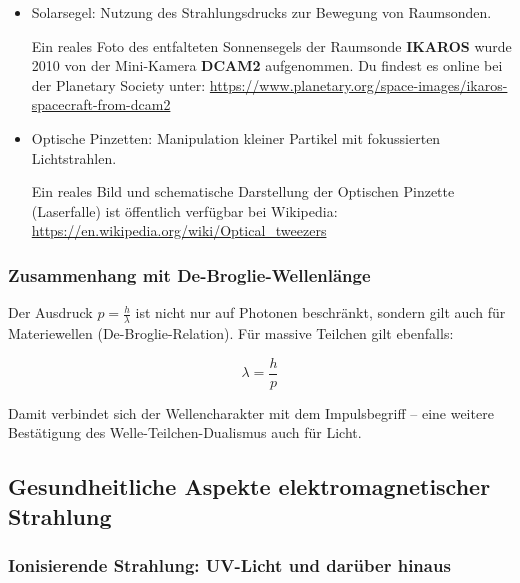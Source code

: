 \begin{itemize}
	\item Solarsegel: Nutzung des Strahlungsdrucks zur Bewegung von Raumsonden.
	\begin{tcolorbox}[hinweisbox, title=Reales Bildmaterial]
		\label{keybox:RealesBildmaterial}
		Ein reales Foto des entfalteten Sonnensegels der Raumsonde \textbf{IKAROS} wurde 2010 von der Mini-Kamera \textbf{DCAM2} aufgenommen.  
		Du findest es online bei der Planetary Society unter:  
		\url{https://www.planetary.org/space-images/ikaros-spacecraft-from-dcam2}
	\end{tcolorbox}
	\item Optische Pinzetten: Manipulation kleiner Partikel mit fokussierten Lichtstrahlen.
	\begin{tcolorbox}[hinweisbox, title=Reales Bildmaterial zur optischen Pinzette]
		\label{box:Manipulation kleiner Partikel}
		Ein reales Bild und schematische Darstellung der Optischen Pinzette (Laserfalle) ist öffentlich verfügbar bei Wikipedia:  
		\url{https://en.wikipedia.org/wiki/Optical_tweezers}
	\end{tcolorbox}
\end{itemize}

\subsubsection{Zusammenhang mit De-Broglie-Wellenlänge}

Der Ausdruck \( p = \frac{h}{\lambda} \) ist nicht nur auf Photonen beschränkt, sondern gilt auch für Materiewellen (De-Broglie-Relation). Für massive Teilchen gilt ebenfalls:

\[
\lambda = \frac{h}{p}
\]

Damit verbindet sich der Wellencharakter mit dem Impulsbegriff – eine weitere Bestätigung des Welle-Teilchen-Dualismus auch für Licht.

\subsection{Gesundheitliche Aspekte elektromagnetischer  Strahlung}

\subsubsection{Ionisierende Strahlung: UV-Licht und darüber hinaus}

